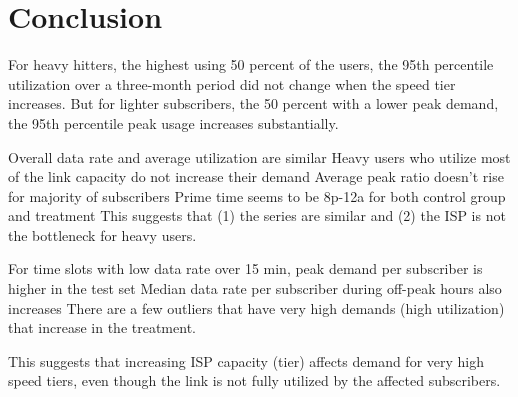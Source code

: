 \section{Conclusion}\label{sec:conclusion}

For heavy hitters, the highest using 50 percent of the users, the 95th 
percentile utilization over a three-month period did not change when the speed 
tier increases. But for lighter subscribers, the 50 percent with a lower peak 
demand, the 95th percentile peak usage increases substantially.


Overall data rate and average utilization are similar
Heavy users who utilize most of the link capacity do
not increase their demand
Average peak ratio doesn’t rise for majority of
subscribers
Prime time seems to be 8p-12a for both control
group and treatment
This suggests that (1) the series are similar and (2) the
ISP is not the bottleneck for heavy users.


For time slots with low data rate over 15 min, peak
demand per subscriber is higher in the test set
Median data rate per subscriber during off-peak
hours also increases
There are a few outliers that have very high demands
(high utilization) that increase in the treatment.

This suggests that increasing ISP capacity (tier)
affects demand for very high speed tiers, even though
the link is not fully utilized by the affected subscribers.